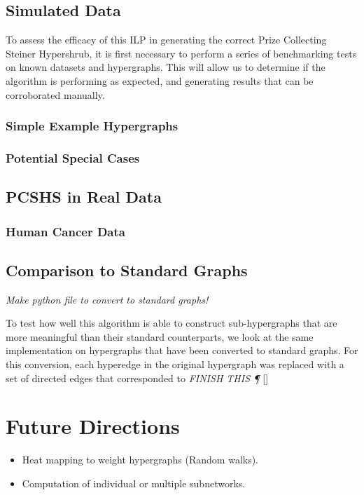 \documentclass[12pt,twoside]{reedthesis}
\newcommand{\new}[2]{{\color{red}#1 [#2]}}
\theoremstyle{definition}
\begin{document}
  \section{Simulated Data}

  To assess the efficacy of this ILP in generating the correct Prize Collecting Steiner Hypershrub, it is first necessary to perform a series of benchmarking tests on known datasets and hypergraphs.  This will allow us to determine if the algorithm is performing as expected, and generating results that can be corroborated manually.\par

  \subsection{Simple Example Hypergraphs}

  \subsection{Potential Special Cases}

  \section{PCSHS in Real Data}

   \subsection{Human Cancer Data}

  \section{Comparison to Standard Graphs}

  \emph{Make python file to convert to standard graphs!}

  \new{To test how well this algorithm is able to construct sub-hypergraphs that are more meaningful than their standard counterparts, we look at the same implementation on hypergraphs that have been converted to standard graphs. For this conversion, each hyperedge in the original hypergraph was replaced with a set of directed edges that corresponded to \emph{FINISH THIS \P}}{}

\chapter{Future Directions}
 \begin{itemize}
   \item{Heat mapping to weight hypergraphs (Random walks).}
   \item{Computation of individual or multiple subnetworks.}
 \end{itemize}
\end{document}

